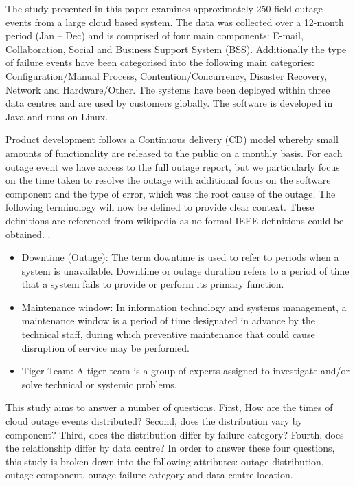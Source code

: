 \documentclass[conference]{IEEEtran}
\begin{document}
The study presented in this paper examines approximately 250 field outage events from a large cloud based system. The data was collected over a 12-month period (Jan -- Dec) and is comprised of four main components: E-mail, Collaboration, Social and Business Support System (BSS). Additionally the type of failure events have been categorised into the following main categories: Configuration/Manual Process, Contention/Concurrency, Disaster Recovery, Network and Hardware/Other. The systems have been deployed within three data centres and are used by customers globally. The software is developed in Java and runs on Linux. \par 

Product development follows a Continuous delivery (CD) model whereby small amounts of functionality are released to the public on a monthly basis. For each outage event we have access to the full outage report, but we particularly focus on the time taken to resolve the outage with additional focus on the software component and the type of error, which was the root cause of the outage. The following terminology will now be defined to provide clear context. These definitions are referenced from wikipedia as no formal IEEE definitions could be obtained. \cite{wikidef}. \par


\begin{itemize}
 \item Downtime (Outage): The term downtime is used to refer to periods when a system is unavailable. Downtime or outage duration refers to a period of time that a system fails to provide or perform its primary function. 
 \item  Maintenance window: In information technology and systems management, a maintenance window is a period of time designated in advance by the technical staff, during which preventive maintenance that could cause disruption of service may be performed.
 \item Tiger Team: A tiger team is a group of experts assigned to investigate and/or solve technical or systemic problems. 
\end{itemize}

This study aims to answer a number of questions. First, How are the times of cloud outage events distributed? Second, does the distribution vary by component? Third, does the distribution differ by failure category? Fourth, does the relationship differ by data centre? In order to answer these four questions, this study is broken down into the following attributes: outage distribution, outage component, outage failure category and  data centre location. \par
\end{document}
